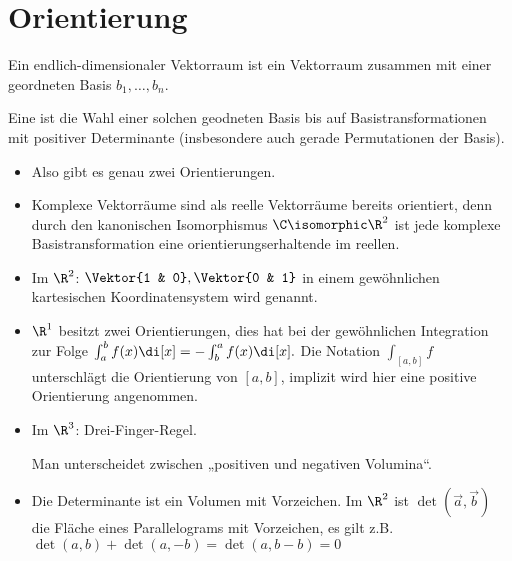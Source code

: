 
\section{Orientierung}

\begin{df}
    Ein  endlich-dimensionaler Vektorraum ist ein Vektorraum zusammen mit einer geordneten Basis $b_1, \dotsc, b_n$.

    Eine  ist die Wahl einer solchen geodneten Basis bis auf Basistransformationen mit positiver Determinante (insbesondere auch gerade Permutationen der Basis).
\end{df}

\begin{note}
    \begin{itemize}
        \item
            Also gibt es genau zwei Orientierungen.
        \item
            Komplexe Vektorräume sind als reelle Vektorräume bereits orientiert, denn durch den kanonischen Isomorphismus $\C \isomorphic \R^2$ ist jede komplexe Basistransformation eine orientierungserhaltende im reellen.
        \item
            Im $\R^2$:
            \begin{math}
                \Vektor{1 & 0},
                \Vektor{0 & 1}
            \end{math}
            in einem gewöhnlichen kartesischen Koordinatensystem wird  genannt.
        \item
            $\R^1$ besitzt zwei Orientierungen, dies hat bei der gewöhnlichen Integration zur Folge
            \begin{math}
                \int_a^b f(x) \di[x] = - \int_b^a f(x) \di[x].
            \end{math}
            Die Notation $\int_{[a,b]} f$ unterschlägt die Orientierung von $[a,b]$, implizit wird hier eine positive Orientierung angenommen.
        \item
            Im $\R^3$: Drei-Finger-Regel.

            Man unterscheidet zwischen „positiven und negativen Volumina“.
        \item
            Die Determinante ist ein Volumen mit Vorzeichen.
            Im $\R^2$ ist $\det(\vec a, \vec b)$ die Fläche eines Parallelograms mit Vorzeichen, es gilt z.B.
            \begin{math}
                \det(a, b) + \det(a, -b) = \det(a, b-b) = 0
            \end{math}
    \end{itemize}
\end{note}


